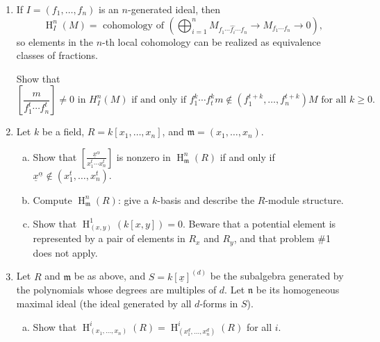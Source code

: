 \documentclass[11pt]{book}
\numberwithin{equation}{section}
\numberwithin{theorem}{chapter}
\theoremstyle{definition}
\newtheorem*{basic properties}{Basic Properties}
\newtheorem*{Important Remark}{Important Remark}
\theoremstyle{remark}
\newcommand{\m}{\mathfrak{m}}
\newcommand{\n}{\mathfrak{n}}
\renewcommand{\H}{\operatorname{H}}
\begin{document}
	
\begin{enumerate}[1)]\setcounter{enumi}{0}
	
	\item{} If $I=(f_1,\dots,f_n)$ is an $n$-generated ideal, then
	\[ \H^n_I(M) = \text{ cohomology of } \left( \bigoplus_{i=1}^n M_{f_1 \cdots \widehat{f_i} \cdots f_n} \to M_{f_1 \cdots f_n} \to 0 \right), \]
	so elements in the $n$-th local cohomology can be realized as equivalence classes of fractions.
	
	Show that \[\left[\frac{m}{f_1^t\cdots f_n^t}\right] \neq 0 \text{ in } H^n_I(M) \text{ if and only if } f_1^k \cdots f_t^k m \notin \left( f_1^{t+k}, \ldots, f_n^{t+k} \right)M \textrm{ for all } k\geq 0.\]
	

	
	
	
	\item Let $k$ be a field, $R=k[x_1,\dots,x_n]$, and $\m=(x_1,\dots,x_n)$.
	
	
	\begin{enumerate}[a)]
			\item Show that $\displaystyle\left[ \frac{\underline{x}^{\underline{\alpha}}}{x_1^t\cdots x_n^t} \right]$ is nonzero in $\H^n_\m(R)$ if and only if $\underline{x}^{\underline{\alpha}} \notin (x_1^t,\dots, x_n^t)$.
	
	
	\item Compute $\H^n_\m(R)$: give a $k$-basis and describe the $R$-module structure.
	
		
		\item Show that $\H^1_{(x,y)}(k[x,y])=0$. Beware that a potential element is represented by a pair of elements in $R_x$ and $R_y$, and that problem \#1 does not apply.
	\end{enumerate}
	

	
	\item Let $R$ and $\m$ be as above, and $S = k[\underline{x}]^{(d)}$ be the subalgebra generated by the polynomials whose degrees are multiples of $d$. Let $\n$ be its homogeneous maximal ideal (the ideal generated by all $d$-forms in $S$).
	

	
	
	
	\begin{enumerate}[a)]
		\item Show that $\H^i_{(x_1,\dots,x_n)}(R)=\H^i_{(x_1^d,\dots,x_n^d)}(R)$ for all $i$.
		


\end{enumerate}
\end{enumerate}
\end{document}
